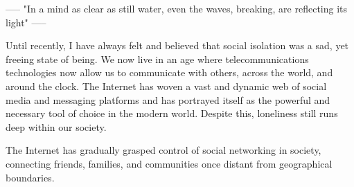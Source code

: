 	 -----
	 "In a mind as clear as still water, even the waves, breaking, are reflecting its light"
	 -----

	Until recently, I have always felt and believed that social isolation was a sad, yet freeing state of being. We now live in an age where telecommunications technologies now allow us to communicate with others, across the world, and around the clock. The Internet has woven a vast and dynamic web of social media and messaging platforms and has portrayed itself as the powerful and necessary tool of choice in the modern world. Despite this, loneliness still runs deep within our society.

	The Internet has gradually grasped control of social networking in society, connecting friends, families, and communities once distant from geographical boundaries.
